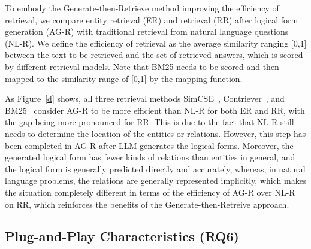 \documentclass{article} \usepackage{iclr2024_conference,times}
\begin{document}
To embody the Generate-then-Retrieve method improving the efficiency of retrieval, we compare entity retrieval (ER) and retrieval (RR) after logical form generation (AG-R) with traditional retrieval from natural language questions (NL-R). We define the efficiency of retrieval as the average similarity ranging [0,1] between the text to be retrieved and the set of retrieved answers, which is scored by different retrieval models. Note that BM25 needs to be scored and then mapped to the similarity range of [0,1] by the mapping function. 

As Figure~\ref{d} shows, all three retrieval methods SimCSE~\citep{SimCSE}, Contriever~\citep{Contriever}, and BM25~\citep{BM25} consider AG-R to be more efficient than NL-R for both ER and RR, with the gap being more pronounced for RR. This is due to the fact that NL-R still needs to determine the location of the entities or relations. However, this step has been completed in AG-R after LLM generates the logical forms. Moreover, the generated logical form has fewer kinds of relations than entities in general, and the logical form is generally predicted directly and accurately, whereas, in natural language problems, the relations are generally represented implicitly, which makes the situation completely different in terms of the efficiency of AG-R over NL-R on RR, which reinforces the benefits of the Generate-then-Retreive approach.



\subsection{Plug-and-Play Characteristics (RQ6)}
\end{document}
